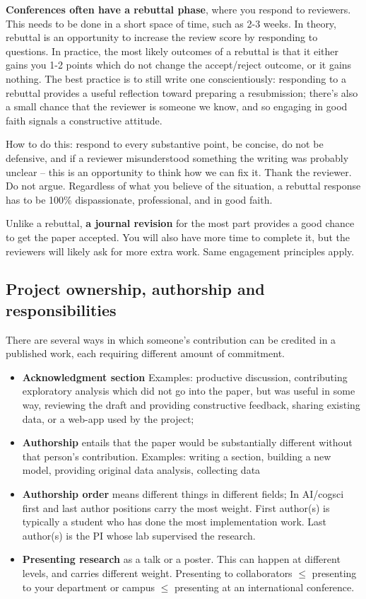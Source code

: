 \documentclass[11pt, letterpaper]{article}
\begin{document}
\textbf{Conferences often have a rebuttal phase}, where you respond to reviewers. This needs to be done in a short space of time, such as 2-3 weeks. In theory, rebuttal is an opportunity to increase the review score by responding to questions. In practice, the most likely outcomes of a rebuttal is that it either gains you 1-2 points which do not change the accept/reject outcome, or it gains nothing. 
The best practice is to still write one conscientiously: responding to a rebuttal provides a useful reflection toward preparing a resubmission; there's also a small chance that the reviewer is someone we know, and so engaging in good faith signals a constructive attitude. 

How to do this: respond to every substantive point, be concise, do not be defensive, and if a reviewer misunderstood something the writing was probably unclear -- this is an opportunity to think how we can fix it. Thank the reviewer. Do not argue. Regardless of what you believe of the situation, a rebuttal response has to be 100\% dispassionate, professional, and in good faith.

Unlike a rebuttal, \textbf{a journal revision} for the most part provides a good chance to get the paper accepted. You will also have more time to complete it, but the reviewers will likely ask for more extra work. Same engagement principles apply.

 
\subsection{Project ownership, authorship and responsibilities}
There are several ways in which someone's contribution can be credited in a published work, each requiring different amount of commitment. 

\begin{itemize}
    \item \textbf{Acknowledgment section} Examples: productive discussion, contributing exploratory analysis which did not go into the paper, but was useful in some way, reviewing the draft and providing constructive feedback, sharing existing data, or a web-app used by the project;
    \item \textbf{Authorship} entails that the paper would be substantially different without that person's contribution. Examples: writing a section, building a new model, providing original data analysis, collecting data 
    \item \textbf{Authorship order} means different things in different fields; In AI/cogsci first and last author positions carry the most weight. First author(s) is typically a student who has done the most implementation work. Last author(s) is the PI whose lab supervised the research.
    \item \textbf{Presenting research} as a talk or a poster. This can happen at different levels, and carries different weight. Presenting to collaborators $\leq$ presenting to your department or campus $\leq$ presenting at an international conference.  
\end{itemize}
\end{document}
